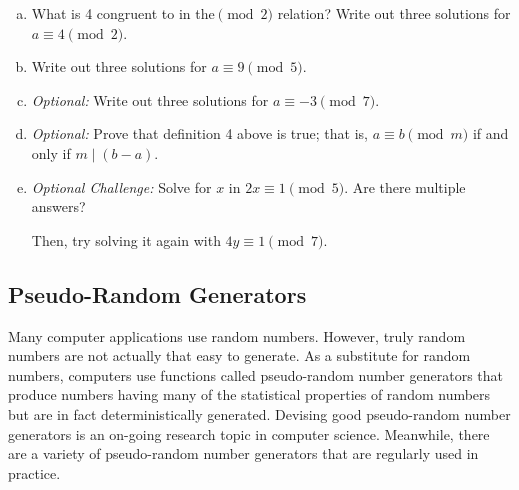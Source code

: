 \documentclass[12pt,letterpaper]{article}
\newif\ifsol
\newcommand{\solu}[2]{ \begin{mdframed} \ifsol #2 \else \vspace{#1} \fi \end{mdframed} }
\begin{document}
	\begin{enumerate}[a.]
	    \item What is 4 congruent to in the$\pmod 2$ relation? Write out three solutions for $a \equiv 4 \pmod 2$.
	    \solu{1 cm}{\{..., -4, -2, 0, 2, 4,...\}}
	    
	    \item 
	    Write out three solutions for $a \equiv 9 \pmod 5$.
	    
	    \solu{1 cm}{\{..., -6, -1, 4, 9, 14,...\}}
	    
	    \item \textit{Optional:} Write out three solutions for $a \equiv -3 \pmod 7$.
	    \solu{1 cm}{\{..., -10, -3, 4, 11, 18...\}}
	    
	    \item \textit{Optional:} Prove that definition 4 above is true; that is, $a \equiv b \pmod m$ if and only if $m \mid (b-a)$.
	    
	    \solu{3cm}{
	    We break the proof into two parts for the biconditional: 
	    
	    If $a \equiv b \pmod m$, then there are integers $q$, $q'$ and $r$, with $a=qm+r$ and $b=q'm+r$. So, $b-a=(q'm+r)-(qm+r)=(q'-q)m$, which means $m\mid b-a$.
    
        If $m \mid (b-a)$, then there is an $x$ with $b-a=xm$; that is, $b=a+xm$. We can write $a$ in its divisibility algorithm form as $a = qm + r$. Substitute this and we have $b = qm + r + xm = m(q+x) + r$. This shows that $b$ has the same remainder as $a$ when divided by $m$, so we have shown that $a \equiv b \pmod m$ if $m \mid (b-a)$.}
        
        \item \textit{Optional Challenge:} Solve for $x$ in $2x \equiv 1 \pmod 5$. Are there multiple answers?
        
        Then, try solving it again with $4y \equiv 1 \pmod 7$.
        
        \solu{2cm}{
        $x = \{\ldots, 3, 8, 13, \ldots\}$
        $y = \{\ldots, 2, 9, 16, \ldots\}$
        }
    \end{enumerate}

\newpage
\subsection*{Pseudo-Random Generators}
Many computer applications use random numbers. However, truly random numbers are not actually that easy to generate. As a substitute for random numbers, computers use functions called pseudo-random number generators that produce numbers having many of the statistical properties of random numbers but are in fact deterministically generated. Devising good pseudo-random number generators is an on-going research topic in computer science. Meanwhile, there are a variety of pseudo-random number generators that are regularly used in practice.
\end{document}
